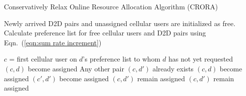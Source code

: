 \documentclass[times]{dacauth}
\begin{document}
\par
 \begin{algorithm}	
   \caption{Conservatively Relax Online Resource Allocation Algorithm (CRORA)}
   \label{algorthm3}
    \begin{algorithmic}[1]

       \State Newly arrived D2D pairs and unassigned cellular users are initialized as free.  
        \State Calculate preference list for free cellular users and D2D pairs using Eqn.~(\ref{eqn:sum rate increment})
			
		
			\State $c$ = first cellular user on $d$'s preference list to whom $d$ has not yet requested
				\State $(c,d)$ become assigned
			\Else
				\State Any other pair $(c, d')$ already exists
                     	\State $(c,d)$ become assigned
                     	\State $(c',d')$ become assigned                     	
					 \Else
						\State $(c, d')$ remain assigned
						\EndIf						
 	            \Else
					\State $(c, d')$ remain assigned
					
				\EndIf
			\EndIf
		\EndWhile      	
	\EndProcedure

\end{algorithmic}
\end{algorithm}
\end{document}
